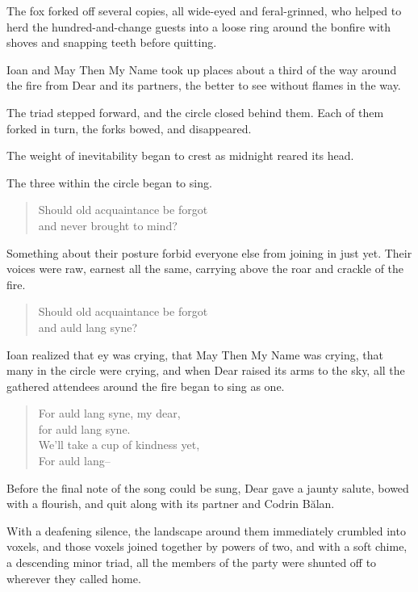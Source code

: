 The fox forked off several copies, all wide-eyed and feral-grinned, who helped to herd the hundred-and-change guests into a loose ring around the bonfire with shoves and snapping teeth before quitting.

Ioan and May Then My Name took up places about a third of the way around the fire from Dear and its partners, the better to see without flames in the way.

The triad stepped forward, and the circle closed behind them. Each of them forked in turn, the forks bowed, and disappeared.

The weight of inevitability began to crest as midnight reared its head.

The three within the circle began to sing.

\begin{quote}
Should old acquaintance be forgot\\
and never brought to mind?
\end{quote}

Something about their posture forbid everyone else from joining in just yet. Their voices were raw, earnest all the same, carrying above the roar and crackle of the fire.

\begin{quote}
Should old acquaintance be forgot\\
and auld lang syne?
\end{quote}

Ioan realized that ey was crying, that May Then My Name was crying, that many in the circle were crying, and when Dear raised its arms to the sky, all the gathered attendees around the fire began to sing as one.

\begin{quote}
For auld lang syne, my dear,\\
for auld lang syne.\\
We'll take a cup of kindness yet,\\
For auld lang--
\end{quote}

Before the final note of the song could be sung, Dear gave a jaunty salute, bowed with a flourish, and quit along with its partner and Codrin Bălan.

With a deafening silence, the landscape around them immediately crumbled into voxels, and those voxels joined together by powers of two, and with a soft chime, a descending minor triad, all the members of the party were shunted off to wherever they called home.

